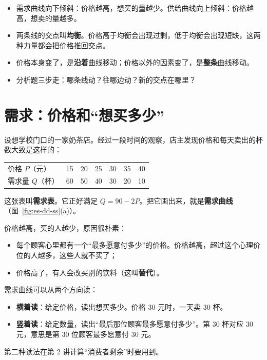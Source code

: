 
\begin{keypoints}
\begin{itemize}
  \item 需求曲线向下倾斜：价格越高，想买的量越少。供给曲线向上倾斜：价格越高，想卖的量越多。
  \item 两条线的交点叫\textbf{均衡}。价格高于均衡会出现过剩，低于均衡会出现短缺，这两种力量都会把价格推回交点。
  \item 价格本身变了，是\textbf{沿着}曲线移动；价格以外的因素变了，是\textbf{整条}曲线移动。
  \item 分析题三步走：哪条线动？往哪边动？新的交点在哪里？
\end{itemize}
\end{keypoints}

\section{需求：价格和“想买多少”}

设想学校门口的一家奶茶店。经过一段时间的观察，店主发现价格和每天卖出的杯数大致是这样的：
\begin{center}
\small
\begin{tabular}{l*{6}{c}}
  \toprule
  价格 $P$（元） & 15 & 20 & 25 & 30 & 35 & 40 \\
  需求量 $Q$（杯） & 60 & 50 & 40 & 30 & 20 & 10 \\
  \bottomrule
\end{tabular}
\end{center}
这张表叫\textbf{需求表}。它正好满足 $Q=90-2P$。把它画出来，就是\textbf{需求曲线}（图~\ref{fig:es-dd-ss}(a)）。

价格越高，买的人越少，原因很朴素：
\begin{itemize}
  \item 每个顾客心里都有一个“最多愿意付多少”的价格。价格越高，超过这个心理价位的人越多，这些人就不买了；
  \item 价格高了，有人会改买别的饮料（这叫\textbf{替代}）。
\end{itemize}

需求曲线可以从两个方向读：
\begin{itemize}
  \item \textbf{横着读}：给定价格，读出想买多少。价格 30 元时，一天卖 30 杯。
  \item \textbf{竖着读}：给定数量，读出“最后那位顾客最多愿意付多少”。第 30 杯对应 30 元，意思是第 30 位顾客最多愿意付 30 元。
\end{itemize}
第二种读法在第 2 讲计算“消费者剩余”时要用到。


